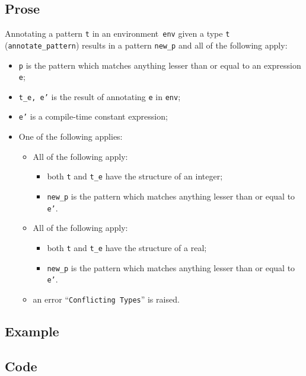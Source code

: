 \documentclass{book}
\begin{document}
  \subsection{Prose}
   Annotating a pattern \texttt{t} in an environment~\texttt{env} given a type \texttt{t} (\texttt{annotate\_pattern}) results in a pattern \texttt{new\_p} and all of the following apply:
   \begin{itemize}
   \item \texttt{p} is the pattern which matches anything lesser than or equal to an expression \texttt{e};
   \item \texttt{t\_e, e'} is the result of annotating \texttt{e} in \texttt{env};
   \item \texttt{e'} is a compile-time constant expression;
   \item One of the following applies:
     \begin{itemize}
     \item All of the following apply:
           \begin{itemize}
           \item both \texttt{t} and \texttt{t\_e} have the structure of an integer;
           \item \texttt{new\_p} is the pattern which matches anything lesser than or equal to \texttt{e'}.
           \end{itemize}
     \item All of the following apply:
           \begin{itemize}
           \item both \texttt{t} and \texttt{t\_e} have the structure of a real;
           \item \texttt{new\_p} is the pattern which matches anything lesser than or equal to \texttt{e'}.
           \end{itemize}
     \item an error ``\texttt{Conflicting Types}'' is raised.
     \end{itemize}
   \end{itemize}

  \subsection{Example}

  \subsection{Code}
\end{document}
